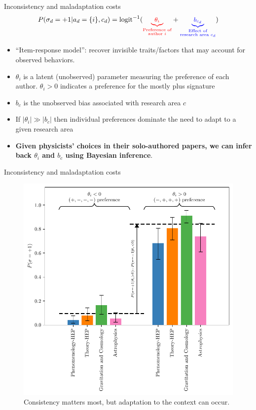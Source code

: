 \documentclass[10pt]{beamer}
\begin{document}
\begin{frame}{Inconsistency and maladaptation costs}
\vspace{-1em}
\begin{equation}
    \small P(\sigma_d=+1|a_d=\{i\},c_d) = \mathrm{logit}^{-1}(\textcolor{red}{\underbrace{\theta_i}_{\substack{\text{Preference of}\\\text{author } i}}}+\textcolor{blue}{\underbrace{b_{c_d}}_{\substack{\text{Effect of}\\\text{research area } c_d}}})%
\end{equation}

\begin{itemize}
    \item ``Item-response model'': recover invisible traits/factors that may account for observed behaviors.
    \item $\theta_i$ is a latent (unobserved) parameter measuring the preference of each author. $\theta_i>0$ indicates a preference for the mostly plus signature
    \item $b_c$ is the unobserved bias associated with research area $c$
    \item If $|\theta_i|\gg |b_c|$ then individual preferences dominate the need to adapt to a given research area
    \item \textbf{Given physicists' choices in their solo-authored papers, we can infer back $\theta_i$ and $b_c$ using Bayesian inference}.
\end{itemize}
\end{frame}

\begin{frame}{Inconsistency and maladaptation costs}
\vspace{-1em}
\begin{figure}
\centering
\includegraphics[width=0.5\linewidth]{consistency_vs_task_barplot.pdf}
    \vspace{-0.75em}
    \caption{Consistency matters most, but adaptation to the context can occur.}
\end{figure}
\end{frame}
\end{document}

